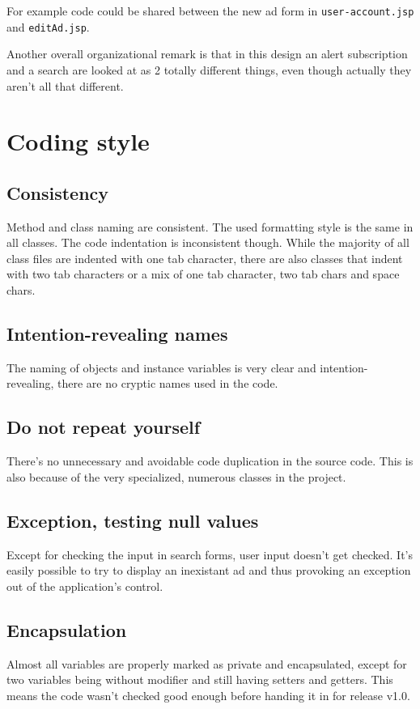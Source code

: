 \documentclass[a4wide]{article}
\begin{document}
For example code could be shared between the new ad form in \texttt{user-account.jsp} and \texttt{editAd.jsp}. 

Another overall organizational remark is that in this design an alert subscription and a search are looked at as 2 totally different things, even though actually they aren't all that different. 

\section{Coding style}
\subsection{Consistency}
Method and class naming are consistent. The used formatting style is the same in all classes. The code indentation is inconsistent though. While the majority of all class files are indented with one tab character, there are also classes that indent with two tab characters or a mix of one tab character, two tab chars and space chars.
\subsection{Intention-revealing names}
The naming of objects and instance variables is very clear and intention-revealing, there are no cryptic names used in the code.
\subsection{Do not repeat yourself}
There's no unnecessary and avoidable code duplication in the source code. This is also because of the very specialized, numerous classes in the project.
\subsection{Exception, testing null values}
Except for checking the input in search forms, user input doesn't get checked. It's easily possible to try to display an inexistant ad and thus provoking an exception out of the application's control.

\subsection{Encapsulation}
Almost all variables are properly marked as private and encapsulated, except for two variables being without modifier and still having setters and getters. This means the code wasn't checked good enough before handing it in for release v1.0.
\end{document}
